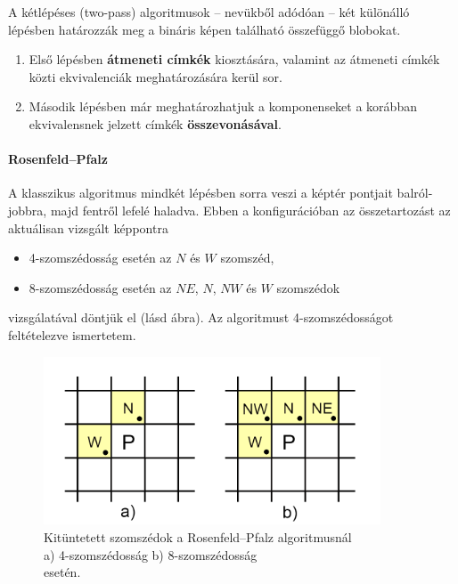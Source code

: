 A kétlépéses (two-pass) algoritmusok -- nevükből adódóan -- két különálló lépésben határozzák meg a bináris képen található összefüggő blobokat.

\begin{enumerate}
  \item Első lépésben \textbf{átmeneti címkék} kiosztására, valamint az átmeneti címkék közti ekvivalenciák meghatározására kerül sor.
  \item Második lépésben már meghatározhatjuk a komponenseket a korábban ekvivalensnek jelzett címkék \textbf{összevonásával}.
\end{enumerate}


\paragraph{Rosenfeld--Pfalz}

A klasszikus algoritmus \cite{rosenfeld} mindkét lépésben sorra veszi a képtér pontjait balról-jobbra, majd fentről lefelé haladva. Ebben a konfigurációban az összetartozást az aktuálisan vizsgált képpontra

\begin{itemize}
  \item 4-szomszédosság esetén az $N$ és $W$ szomszéd,
  \item 8-szomszédosság esetén az $NE$, $N$, $NW$ és $W$ szomszédok
\end{itemize}

vizsgálatával döntjük el (lásd  ábra). Az algoritmust 4-szomszédosságot feltételezve ismertetem.

\begin{figure}[!ht]
\centering
\includegraphics[width=100mm, keepaspectratio]{figures/2pass_neighbours.png}
\caption{Kitüntetett szomszédok a Rosenfeld--Pfalz algoritmusnál \\ a) 4-szomszédosság b) 8-szomszédosság \\ esetén.}
\label{fig:2pass_neighbours}
\end{figure}

